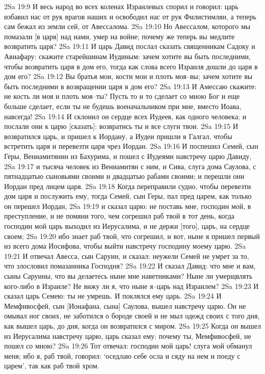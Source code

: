 2Sa 19:9  И весь народ во всех коленах Израилевых спорил и говорил: царь избавил нас от рук врагов наших и освободил нас от рук Филистимлян, а теперь сам бежал из земли сей, от Авессалома.
2Sa 19:10  Но Авессалом, которого мы помазали [в царя] над нами, умер на войне; почему же теперь вы медлите возвратить царя?
2Sa 19:11  И царь Давид послал сказать священникам Садоку и Авиафару: скажите старейшинам Иудиным: зачем хотите вы быть последними, чтобы возвратить царя в дом его, тогда как слова всего Израиля дошли до царя в дом его?
2Sa 19:12  Вы братья мои, кости мои и плоть моя--вы; зачем хотите вы быть последними в возвращении царя в дом его?
2Sa 19:13  И Амессаю скажите: не кость ли моя и плоть моя--ты? Пусть то и то сделает со мною Бог и еще больше сделает, если ты не будешь военачальником при мне, вместо Иоава, навсегда!
2Sa 19:14  И склонил он сердце всех Иудеев, как одного человека; и послали они к царю [сказать]: возвратись ты и все слуги твои.
2Sa 19:15  И возвратился царь, и пришел к Иордану, а Иудеи пришли в Галгал, чтобы встретить царя и перевезти царя чрез Иордан.
2Sa 19:16  И поспешил Семей, сын Геры, Вениамитянин из Бахурима, и пошел с Иудеями навстречу царю Давиду,
2Sa 19:17  и тысяча человек из Вениамитян с ним, и Сива, слуга дома Саулова, с пятнадцатью сыновьями своими и двадцатью рабами своими; и перешли они Иордан пред лицем царя.
2Sa 19:18  Когда переправили судно, чтобы перевезти дом царя и послужить ему, тогда Семей, сын Геры, пал пред царем, как только он перешел Иордан,
2Sa 19:19  и сказал царю: не поставь мне, господин мой, в преступление, и не помяни того, чем согрешил раб твой в тот день, когда господин мой царь выходил из Иерусалима, и не держи [того], царь, на сердце своем;
2Sa 19:20  ибо знает раб твой, что согрешил, и вот, ныне я пришел первый из всего дома Иосифова, чтобы выйти навстречу господину моему царю.
2Sa 19:21  И отвечал Авесса, сын Саруин, и сказал: неужели Семей не умрет за то, что злословил помазанника Господня?
2Sa 19:22  И сказал Давид: что мне и вам, сыны Саруины, что вы делаетесь ныне мне наветниками? Ныне ли умерщвлять кого-либо в Израиле? Не вижу ли я, что ныне я--царь над Израилем?
2Sa 19:23  И сказал царь Семею: ты не умрешь. И поклялся ему царь.
2Sa 19:24  И Мемфивосфей, сын [Ионафана, сына] Саулова, вышел навстречу царю. Он не омывал ног своих, не заботился о бороде своей и не мыл одежд своих с того дня, как вышел царь, до дня, когда он возвратился с миром.
2Sa 19:25  Когда он вышел из Иерусалима навстречу царю, царь сказал ему: почему ты, Мемфивосфей, не пошел со мною?
2Sa 19:26  Тот отвечал: господин мой царь! слуга мой обманул меня; ибо я, раб твой, говорил: `оседлаю себе осла и сяду на нем и поеду с царем', так как раб твой хром.
